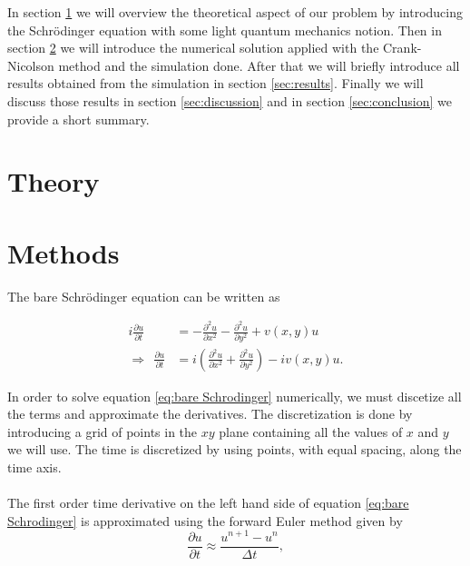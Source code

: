 \documentclass[english,notitlepage,reprint,nofootinbib]{revtex4-2}  %
\begin{document}
	In section \ref{sec:theory} we will overview the theoretical aspect of our problem by introducing
	the Schrödinger equation with some light quantum mechanics notion. Then in section \ref{sec:methods}
	we will introduce the numerical solution applied with the Crank-Nicolson method and the simulation
	done. After that we will briefly introduce all results obtained from the simulation in section 
	\ref{sec:results}. Finally we will discuss those results in section \ref{sec:discussion} and
	in section  \ref{sec:conclusion} we provide a short summary. 
	
	
	\section{Theory} \label{sec:theory}
	
	
	
	
	\section{Methods}\label{sec:methods}
	The bare Schrödinger equation can be written as 

	\begin{equation}\label{eq:bare Schrodinger}
		\begin{split}
		i \frac{\partial u}{\partial t} &= -\frac{\partial^2 u}{\partial x^2} - \frac{\partial^2 u}{\partial y^2} + v(x,y) u\\
		\Rightarrow \ \ \frac{\partial u}{\partial t} &= i\left(\frac{\partial^2 u}{\partial x^2} + \frac{\partial^2 u}{\partial y^2}\right) - iv(x,y) u.
		\end{split}
	\end{equation} 
	
	\noindent
	In order to solve equation \ref{eq:bare Schrodinger} numerically, we must discetize all the terms and approximate
	the derivatives. The discretization is done by introducing a grid of points in the
	$xy$ plane containing all the values of $x$ and $y$ we will use. The time is discretized by using points, with equal spacing, along the time axis.\\ \\
	The first order time derivative on the left hand side of equation \ref{eq:bare Schrodinger} is approximated using the forward Euler method given by
	\begin{equation}
		\frac{\partial u}{\partial t} \approx \frac{u^{n+1}-u^n}{\Delta t},
	\end{equation}
\end{document}
